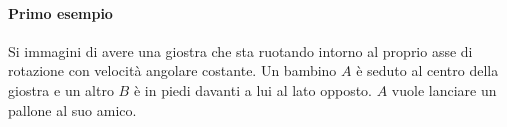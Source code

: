 \documentclass[10pt,a4paper]{book}
\begin{document}
\paragraph{Primo esempio} Si immagini di avere una giostra che sta ruotando intorno al proprio asse di rotazione con velocità angolare costante. Un bambino $A$ è seduto al centro della giostra e un altro $B$ è in piedi davanti a lui al lato opposto. $A$ vuole lanciare un pallone al suo amico.
\begin{figure}[htpb]
	\centering
	


	\begin{tikzpicture}[x=0.75pt,y=0.75pt,yscale=-1,xscale=1]


\end{tikzpicture}
\end{figure}
\end{document}
